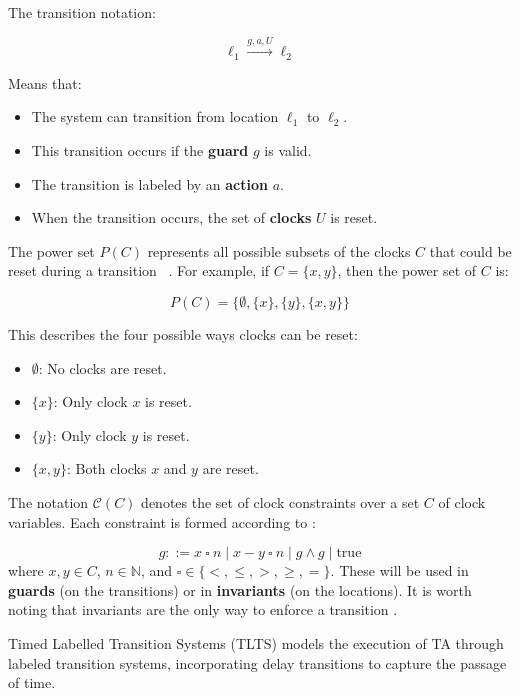 The transition notation:

\[
\ell_1 \xrightarrow{g, a, U} \ell_2
\]

Means that:
\begin{itemize}
    \item The system can transition from location \( \ell_1 \) to \( \ell_2 \).
    \item This transition occurs if the \textbf{guard} \( g \) is valid.
    \item The transition is labeled by an \textbf{action} \( a \).
    \item When the transition occurs, the set of \textbf{clocks} \( U \) is reset.
\end{itemize}

The power set \( P(C) \) represents all possible subsets of the clocks \( C \) that could be reset during a transition ~\cite{baukus2002power}. For example, if \( C = \{x, y\} \), then the power set of \( C \) is:

\[
P(C) = \{\emptyset, \{x\}, \{y\}, \{x, y\}\}
\]

This describes the four possible ways clocks can be reset:

\begin{itemize}
    \item \( \emptyset \): No clocks are reset.
    \item \( \{x\} \): Only clock \( x \) is reset.
    \item \( \{y\} \): Only clock \( y \) is reset.
    \item \( \{x, y\} \): Both clocks \( x \) and \( y \) are reset.
\end{itemize} 

The notation \( \mathcal{C}(C) \) denotes the set of clock constraints over a set \( C \) of clock variables. Each constraint is formed according to \cite{baier2008principles}:

\[
g ::= x \ \square \ n \mid x - y \ \square \ n \mid g \land g \mid \text{true}
\]
where \( x, y \in C \), \( n \in \mathbb{N} \), and \( \square \in \{ <, \leq, >, \geq, = \} \). These will be used in \textbf{guards} (on the transitions) or in \textbf{invariants} (on the locations). It is worth noting that invariants are the only way to enforce a transition \cite{baier2008principles}. 


Timed Labelled Transition Systems (TLTS) models the execution of TA through labeled transition systems, incorporating delay transitions to capture the passage of time.


